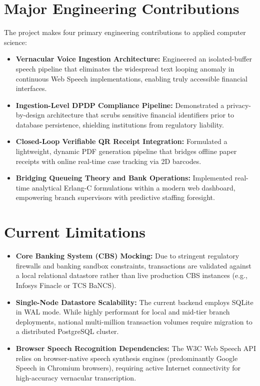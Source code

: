 \section{Major Engineering Contributions}
The project makes four primary engineering contributions to applied computer science:
\begin{itemize}
    \item \textbf{Vernacular Voice Ingestion Architecture:} Engineered an isolated-buffer speech pipeline that eliminates the widespread text looping anomaly in continuous Web Speech implementations, enabling truly accessible financial interfaces.
    \item \textbf{Ingestion-Level DPDP Compliance Pipeline:} Demonstrated a privacy-by-design architecture that scrubs sensitive financial identifiers prior to database persistence, shielding institutions from regulatory liability.
    \item \textbf{Closed-Loop Verifiable QR Receipt Integration:} Formulated a lightweight, dynamic PDF generation pipeline that bridges offline paper receipts with online real-time case tracking via 2D barcodes.
    \item \textbf{Bridging Queueing Theory and Bank Operations:} Implemented real-time analytical Erlang-C formulations within a modern web dashboard, empowering branch supervisors with predictive staffing foresight.
\end{itemize}

\section{Current Limitations}
\begin{itemize}
    \item \textbf{Core Banking System (CBS) Mocking:} Due to stringent regulatory firewalls and banking sandbox constraints, transactions are validated against a local relational datastore rather than live production CBS instances (e.g., Infosys Finacle or TCS BaNCS).
    \item \textbf{Single-Node Datastore Scalability:} The current backend employs SQLite in WAL mode. While highly performant for local and mid-tier branch deployments, national multi-million transaction volumes require migration to a distributed PostgreSQL cluster.
    \item \textbf{Browser Speech Recognition Dependencies:} The W3C Web Speech API relies on browser-native speech synthesis engines (predominantly Google Speech in Chromium browsers), requiring active Internet connectivity for high-accuracy vernacular transcription.
\end{itemize}


